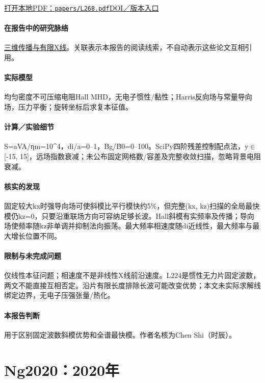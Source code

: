 \href{run:papers/L268.pdf}{打开本地PDF：\texttt{papers/L268.pdf}}\quad\href{https://doi.org/10.3847/1538-4357/abb6fa}{DOI／版本入口}

\paragraph{在报告中的研究脉络}\hyperref[story:three]{三维传播与有限X线}。关联表示本报告的阅读线索，不自动表示这些论文互相引用。

\paragraph{实际模型}均匀密度不可压缩电阻Hall MHD，无电子惯性/黏性；Harris反向场与常量导向场，压力平衡；旋转坐标后求复本征值。

\paragraph{计算／实验细节}S=aVA/ηm=10\textasciicircum{}4，di/a=0–1，Bg/B0=0–100。SciPy四阶残差控制配点法，y\ensuremath{\in}[-15, 15]，远场指数衰减；未公布固定网格数/容差及完整收敛扫描，忽略背景电阻衰减。

\paragraph{核实的发现}固定较大kx时强导向场可使斜模比平行模快约5\%，但完整(kx, kz)扫描的全局最快模仍kz=0，只要沿重联场方向可容纳足够长波。Hall斜模有实频率及传播；导向场使频率随kz非单调并抑制法向振荡。最大频率相速度随di近线性，最大频率与最大增长位置不同。

\paragraph{限制与未完成问题}仅线性本征问题；相速度不是非线性X线前沿速度。L224是惯性无力片固定波数，两文不能直接互相否定。沿片有限长度排除长波可能改变优势；本文未实际求解线绑定边界，无电子压强张量/热化。

\paragraph{本报告判断}用于区别固定波数斜模优势和全谱最快模。作者名核为Chen Shi（时辰）。

\section{Ng2020：2020年}\label{paper:Ng2020}

